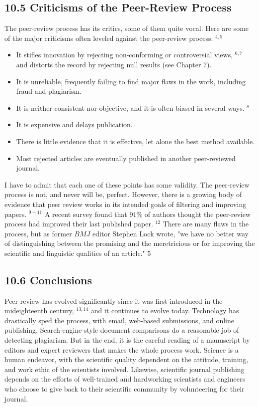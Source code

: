 \subsection*{10.5 Criticisms of the Peer-Review Process}
The peer-review process has its critics, some of them quite vocal. Here are some of the major criticisms often leveled against the peer-review process: ${ }^{4,5}$

\begin{itemize}
  \item It stifles innovation by rejecting non-conforming or controversial views, ${ }^{6,7}$ and distorts the record by rejecting null results (see Chapter 7).
  \item It is unreliable, frequently failing to find major flaws in the work, including fraud and plagiarism.
  \item It is neither consistent nor objective, and it is often biased in several ways. ${ }^{8}$
  \item It is expensive and delays publication.
  \item There is little evidence that it is effective, let alone the best method available.
  \item Most rejected articles are eventually published in another peer-reviewed journal.
\end{itemize}

I have to admit that each one of these points has some validity. The peer-review process is not, and never will be, perfect. However, there is a growing body of evidence that peer review works in its intended goals of filtering and improving papers. ${ }^{9-11}$ A recent survey found that $91 \%$ of authors thought the peer-review process had improved their last published paper. ${ }^{12}$ There are many flaws in the process, but as former $B M J$ editor Stephen Lock wrote, "we have no better way of distinguishing between the promising and the meretricious or for improving the scientific and linguistic qualities of an article." 5

\subsection*{10.6 Conclusions}
Peer review has evolved significantly since it was first introduced in the mideighteenth century, ${ }^{13,14}$ and it continues to evolve today. Technology has drastically sped the process, with email, web-based submissions, and online publishing. Search-engine-style document comparisons do a reasonable job of detecting plagiarism. But in the end, it is the careful reading of a manuscript by editors and expert reviewers that makes the whole process work. Science is a human endeavor, with the scientific quality dependent on the attitude, training, and work ethic of the scientists involved. Likewise, scientific journal publishing depends on the efforts of well-trained and hardworking scientists and engineers who choose to give back to their scientific community by volunteering for their journal.

